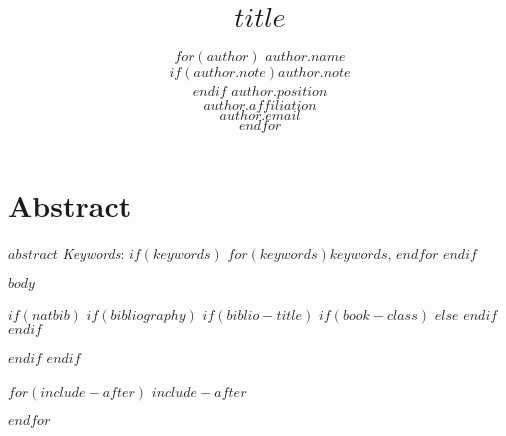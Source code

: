 \documentclass[$for(classoption)$$classoption$$sep$,$endfor$]{trbunofficial}
\title{$title$}
\author{%
  $for(author)$
  \textbf{$author.name$}\\
  \textit{$if(author.note)$$author.note$\\$endif$}
  $author.position$\\
  $author.affiliation$\\
  $author.email$\\
  \hfill\break
  $endfor$
}
\begin{document}
\maketitle


\section{Abstract}
$abstract$
\hfill\break%
\hfill\break%
\noindent\textit{Keywords}: $if(keywords)$ $for(keywords)$$keywords$, $endfor$ $endif$
\newpage

$body$

\newpage
$if(natbib)$
$if(bibliography)$
$if(biblio-title)$
$if(book-class)$
\renewcommand\bibname{$biblio-title$}
$else$
\renewcommand\refname{$biblio-title$}
$endif$
$endif$


$endif$
$endif$

$for(include-after)$
$include-after$

$endfor$
\end{document}
